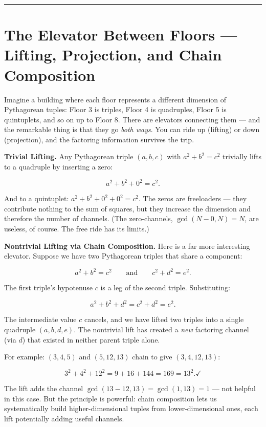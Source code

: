 \documentclass[11pt,openany]{book}
\theoremstyle{definition}
\theoremstyle{plain}
\theoremstyle{remark}
\begin{document}
\bigskip\noindent\rule{\textwidth}{0.4pt}\bigskip


\section*{The Elevator Between Floors — Lifting, Projection, and Chain Composition}


Imagine a building where each floor represents a different dimension of Pythagorean tuples: Floor 3 is triples, Floor 4 is quadruples, Floor 5 is quintuplets, and so on up to Floor 8. There are elevators connecting them — and the remarkable thing is that they go \textit{both ways}. You can ride up (lifting) or down (projection), and the factoring information survives the trip.

\textbf{Trivial Lifting.} Any Pythagorean triple $(a, b, c)$ with $a^2 + b^2 = c^2$ trivially lifts to a quadruple by inserting a zero:

$$a^2 + b^2 + 0^2 = c^2.$$

And to a quintuplet: $a^2 + b^2 + 0^2 + 0^2 = c^2$. The zeros are freeloaders — they contribute nothing to the sum of squares, but they increase the dimension and therefore the number of channels. (The zero-channels, $\gcd(N - 0, N) = N$, are useless, of course. The free ride has its limits.)

\textbf{Nontrivial Lifting via Chain Composition.} Here is a far more interesting elevator. Suppose we have two Pythagorean triples that share a component:

$$a^2 + b^2 = c^2 \qquad \text{and} \qquad c^2 + d^2 = e^2.$$

The first triple's hypotenuse $c$ is a leg of the second triple. Substituting:

$$a^2 + b^2 + d^2 = c^2 + d^2 = e^2.$$

The intermediate value $c$ cancels, and we have lifted two triples into a single quadruple $(a, b, d, e)$. The nontrivial lift has created a \textit{new} factoring channel (via $d$) that existed in neither parent triple alone.

For example: $(3, 4, 5)$ and $(5, 12, 13)$ chain to give $(3, 4, 12, 13)$:

$$3^2 + 4^2 + 12^2 = 9 + 16 + 144 = 169 = 13^2. \checkmark$$

The lift adds the channel $\gcd(13 - 12, 13) = \gcd(1, 13) = 1$ — not helpful in this case. But the principle is powerful: chain composition lets us systematically build higher-dimensional tuples from lower-dimensional ones, each lift potentially adding useful channels.
\end{document}

